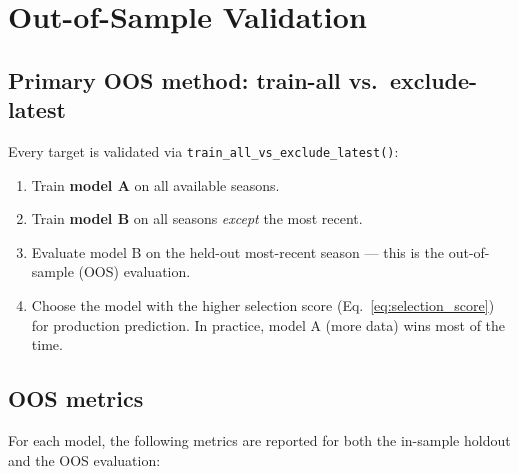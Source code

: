 \documentclass[11pt, a4paper]{article}
\begin{document}
\section{Out-of-Sample Validation}
\label{sec:oos}

\subsection{Primary OOS method: train-all vs.\ exclude-latest}

Every target is validated via \texttt{train\_all\_vs\_exclude\_latest()}:

\begin{enumerate}[leftmargin=*]
  \item Train \textbf{model A} on all available seasons.
  \item Train \textbf{model B} on all seasons \emph{except} the most recent.
  \item Evaluate model B on the held-out most-recent season — this is the out-of-sample (OOS) evaluation.
  \item Choose the model with the higher selection score (Eq.~\ref{eq:selection_score}) for
        production prediction. In practice, model A (more data) wins most of the time.
\end{enumerate}

\subsection{OOS metrics}

For each model, the following metrics are reported for both the in-sample holdout and the OOS
evaluation:
\end{document}
